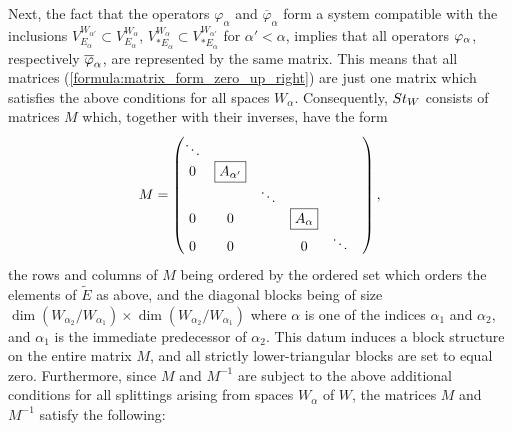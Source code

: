 \documentclass[11pt, a4paper]{article}
\begin{document}
Next, the fact that the operators $\varphi_{\alpha}$ and $\overline{\varphi}_{\alpha}$ form a system compatible with the inclusions $V^{W_{\alpha'}}_{E_{\alpha}}\subset V^{W_{\alpha}}_{E_{\alpha}}$, $V^{W_{\alpha}}_{*E_{\alpha}}\subset V^{W_{\alpha'}}_{*E_{\alpha}}$ for $\alpha'<\alpha$, %
implies that all operators $\varphi_{\alpha}$, respectively $\overline{\varphi}_{\alpha}$, are represented by the same matrix. %
This means that all matrices (\ref{formula:matrix_form_zero_up_right}) are just one matrix  which satisfies the above conditions for all spaces $W_{\alpha}$. Consequently, 
$St_W$ consists of matrices $M$ which, together with their inverses, have the form
\begin{equation}\predisplaypenalty=0\label{formula:matrix_form}
    M=\begin{pmatrix} 
    \ddots & & &  &   \\
    0 & \boxed{A_{\alpha'}} & &  &   \\
    &&\ddots & & \\
    0 & 0 &  & \boxed{A_{\alpha}} &   &  \\ 0
    & 0 &  & 0  & \ddots   \\
    \end{pmatrix},
\end{equation}
the rows and columns of $M$ being ordered by the ordered set which orders the elements of $\widetilde{E}$ as above, 
and the diagonal blocks being of size $\dim (W_{\alpha_2}/W_{\alpha_1}) \times\dim (W_{\alpha_2}/W_{\alpha_1})$ where $\alpha$ is one of the indices $\alpha_1$ and $\alpha_2$, and $\alpha_1$ is the immediate predecessor of $\alpha_2$. %
This datum induces a block structure on the entire matrix $M$, and all strictly lower-triangular blocks are set to equal zero.
Furthermore, since $M$ and $M^{-1}$ are subject to the above 
 additional conditions for all splittings arising from spaces $W_{\alpha}$ of $W$, the matrices $M$ and $M^{-1}$ satisfy the following: %
\end{document}

